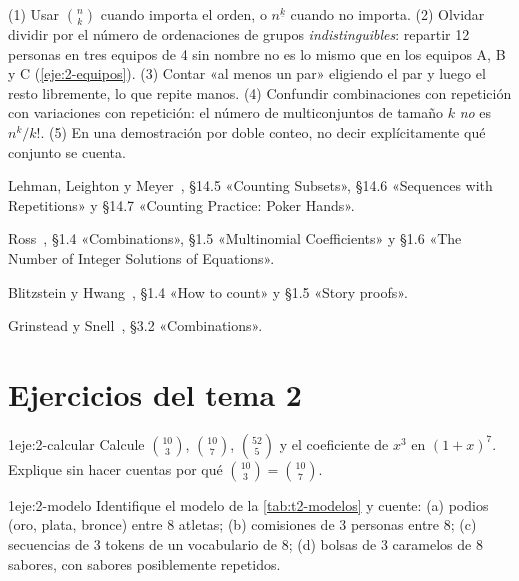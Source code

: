 \begin{observacion}
(1) Usar $\binom{n}{k}$ cuando importa el orden, o $n^{\underline{k}}$ cuando no importa. (2) Olvidar dividir por el número de ordenaciones de grupos \emph{indistinguibles}: repartir 12 personas en tres equipos de 4 sin nombre no es lo mismo que en los equipos A, B y C (\cref{eje:2-equipos}). (3) Contar «al menos un par» eligiendo el par y luego el resto libremente, lo que repite manos. (4) Confundir combinaciones con repetición con variaciones con repetición: el número de multiconjuntos de tamaño $k$ \emph{no} es $n^{k}/k!$. (5) En una demostración por doble conteo, no decir explícitamente qué conjunto se cuenta.
\end{observacion}

\begin{lecturas}
\item Lehman, Leighton y Meyer~\cite{mcs}, §14.5 «Counting Subsets», §14.6 «Sequences with Repetitions» y §14.7 «Counting Practice: Poker Hands».
\item Ross~\cite{ross}, §1.4 «Combinations», §1.5 «Multinomial Coefficients» y §1.6 «The Number of Integer Solutions of Equations».
\item Blitzstein y Hwang~\cite{bh}, §1.4 «How to count» y §1.5 «Story proofs».
\item Grinstead y Snell~\cite{gs}, §3.2 «Combinations».
\end{lecturas}

\section*{Ejercicios del tema 2}

\begin{ejercicio}{1}{eje:2-calcular}
Calcule $\binom{10}{3}$, $\binom{10}{7}$, $\binom{52}{5}$ y el coeficiente de $x^{3}$ en $(1+x)^{7}$. Explique sin hacer cuentas por qué $\binom{10}{3}=\binom{10}{7}$.
\end{ejercicio}

\begin{ejercicio}{1}{eje:2-modelo}
Identifique el modelo de la \cref{tab:t2-modelos} y cuente: (a) podios (oro, plata, bronce) entre 8 atletas; (b) comisiones de 3 personas entre 8; (c) secuencias de 3 tokens de un vocabulario de 8; (d) bolsas de 3 caramelos de 8 sabores, con sabores posiblemente repetidos.
\end{ejercicio}

